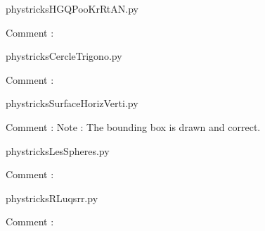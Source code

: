     \clearpage
    


    \newcommand{\CaptionFigHGQPooKrRtAN}{<+Type your caption here+>}
    \begin{center}
        
    \end{center}
    phystricksHGQPooKrRtAN.py

    Comment : 

    \clearpage
    


    \newcommand{\CaptionFigCercleTrigono}{<+Type your caption here+>}
    \begin{center}
        
    \end{center}
    phystricksCercleTrigono.py

    Comment : 

    \clearpage
    


    \newcommand{\CaptionFigSurfaceHorizVerti}{<+Type your caption here+>}
    \begin{center}
        
    \end{center}
    phystricksSurfaceHorizVerti.py

    Comment : Note : The bounding box is drawn and correct.

    \clearpage
    


    \newcommand{\CaptionFigLesSpheres}{<+Type your caption here+>}
    \begin{center}
        
    \end{center}
    phystricksLesSpheres.py

    Comment : 

    \clearpage
    


    \newcommand{\CaptionFigRLuqsrr}{<+Type your caption here+>}
    \begin{center}
        
    \end{center}
    phystricksRLuqsrr.py

    Comment : 

    \clearpage
    

